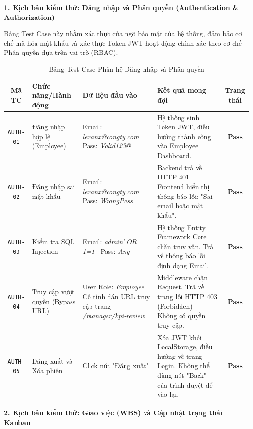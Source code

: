 \documentclass[a4paper,13.5pt]{extreport}
\begin{document}
\textbf{1. Kịch bản kiểm thử: Đăng nhập và Phân quyền (Authentication \& Authorization)}

Bảng Test Case này nhằm xác thực cửa ngõ bảo mật của hệ thống, đảm bảo cơ chế mã hóa mật khẩu và xác thực Token JWT hoạt động chính xác theo cơ chế Phân quyền dựa trên vai trò (RBAC).

\begin{table}[H]
    \centering
    \renewcommand{\arraystretch}{1.4}
    \begin{tabularx}{\textwidth}{|c|p{3.5cm}|X|X|c|}
    \hline
    \textbf{Mã TC} & \textbf{Chức năng/Hành động} & \textbf{Dữ liệu đầu vào} & \textbf{Kết quả mong đợi} & \textbf{Trạng thái} \\
    \hline
    \texttt{AUTH-01} & Đăng nhập hợp lệ (Employee) & Email: \textit{levanx@congty.com} \newline Pass: \textit{Valid123@} & Hệ thống sinh Token JWT, điều hướng thành công vào Employee Dashboard. & \textbf{Pass} \\
    \hline
    \texttt{AUTH-02} & Đăng nhập sai mật khẩu & Email: \textit{levanx@congty.com} \newline Pass: \textit{WrongPass} & Backend trả về HTTP 401. Frontend hiển thị thông báo lỗi: "Sai email hoặc mật khẩu". & \textbf{Pass} \\
    \hline
    \texttt{AUTH-03} & Kiểm tra SQL Injection & Email: \textit{admin' OR 1=1--} \newline Pass: \textit{Any} & Hệ thống Entity Framework Core chặn truy vấn. Trả về thông báo lỗi định dạng Email. & \textbf{Pass} \\
    \hline
    \texttt{AUTH-04} & Truy cập vượt quyền (Bypass URL) & User Role: \textit{Employee} \newline Cố tình dán URL truy cập trang \textit{/manager/kpi-review} & Middleware chặn Request. Trả về trang lỗi HTTP 403 (Forbidden) - Không có quyền truy cập. & \textbf{Pass} \\
    \hline
    \texttt{AUTH-05} & Đăng xuất và Xóa phiên & Click nút "Đăng xuất" & Xóa JWT khỏi LocalStorage, điều hướng về trang Login. Không thể dùng nút "Back" của trình duyệt để vào lại. & \textbf{Pass} \\
    \hline
    \end{tabularx}
    \caption{Bảng Test Case Phân hệ Đăng nhập và Phân quyền}
    \label{tab:tc_auth}
\end{table}

\textbf{2. Kịch bản kiểm thử: Giao việc (WBS) và Cập nhật trạng thái Kanban}
\end{document}
